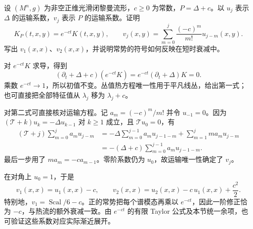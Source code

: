 \begin{exercise}\label{g3:ex:constant-potential-heat-coefficients}
	设 \((M^n,g)\) 为非空正维光滑闭黎曼流形，\(c\ge0\) 为常数，\(P=\Delta+c\)。以 \(u_j\) 表示 \(\Delta\) 的运输系数，\(v_j\) 表示 \(P\) 的运输系数。证明
	\[
		K_P(t,x,y)=e^{-ct}K(t,x,y),\qquad
		v_j(x,y)=\sum_{m=0}^j\frac{(-c)^m}{m!}u_{j-m}(x,y).
	\]
	写出 \(v_1(x,x)\)、\(v_2(x,x)\)，并说明常势的符号如何反映在短时衰减中。
\end{exercise}
\begin{solution}
	对 \(e^{-ct}K\) 求导，得到
	\[
		(\partial_t+\Delta+c)(e^{-ct}K)
		=e^{-ct}(\partial_t+\Delta)K=0.
	\]
	乘数 \(e^{-ct}\to1\)，所以初值不变。丛值热方程唯一性用于平凡线丛，给出第一式；也可直接把全部特征值从 \(\lambda_j\) 移为 \(\lambda_j+c\)。

	对第二式可直接核对运输方程。记 \(a_m=(-c)^m/m!\) 并令 \(u_{-1}=0\)。因为 \((\mathcal T+k)u_k=-\Delta u_{k-1}\) 对 \(k\ge1\) 成立，且 \(\mathcal Tu_0=0\)，有
	\[
		\begin{aligned}
			(\mathcal T+j)\sum_{m=0}^ja_mu_{j-m}
			&=-\Delta\sum_{m=0}^{j-1}a_mu_{j-1-m}
			+\sum_{m=1}^jm a_mu_{j-m}\\
			&=-(\Delta+c)\sum_{m=0}^{j-1}a_mu_{j-1-m}.
		\end{aligned}
	\]
	最后一步用了 \(m a_m=-c a_{m-1}\)。零阶系数仍为 \(u_0\)，故运输唯一性确定了 \(v_j\)。

	在对角上 \(u_0=1\)，于是
	\[
		v_1(x,x)=u_1(x,x)-c,\qquad
		v_2(x,x)=u_2(x,x)-c\,u_1(x,x)+\frac{c^2}{2}.
	\]
	特别地，\(v_1=\operatorname{Scal}/6-c\)。正的常势把每个谱模态再乘以 \(e^{-ct}\)，因此一阶修正恰为 \(-c\)，与热流的额外衰减一致。由 \(e^{-ct}\) 的有限 Taylor 公式及本节统一余项，也可验证这些系数对应实际渐近展开。
\end{solution}

